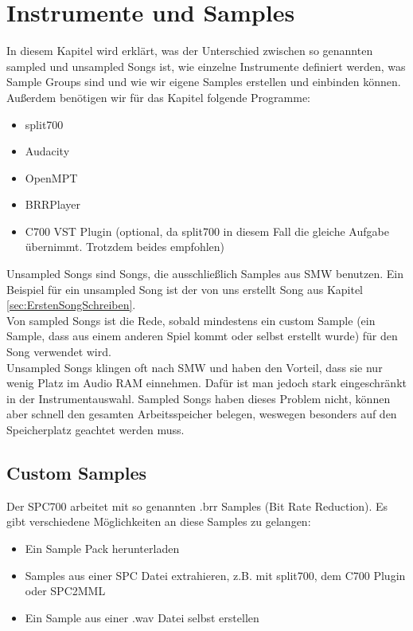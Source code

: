 \section{Instrumente und Samples}

In diesem Kapitel wird erklärt, was der Unterschied zwischen so genannten sampled und unsampled Songs ist, wie einzelne Instrumente definiert werden, was Sample Groups sind und wie wir eigene Samples erstellen und einbinden können. \\
Außerdem benötigen wir für das Kapitel folgende Programme:

\medskip

\begin{itemize}
	\item split700
	\item Audacity
	\item OpenMPT
	\item BRRPlayer
	\item C700 VST Plugin (optional, da split700 in diesem Fall die gleiche Aufgabe übernimmt. Trotzdem beides empfohlen)
\end{itemize}

\medskip


Unsampled Songs sind Songs, die ausschließlich Samples aus SMW benutzen. Ein Beispiel für ein unsampled Song ist der von uns erstellt Song aus Kapitel \ref{sec:ErstenSongSchreiben}. \\
Von sampled Songs ist die Rede, sobald mindestens ein custom Sample (ein Sample, dass aus einem anderen Spiel kommt oder selbst erstellt wurde) für den Song verwendet wird. \\
Unsampled Songs klingen oft nach SMW und haben den Vorteil, dass sie nur wenig Platz im Audio RAM einnehmen. Dafür ist man jedoch stark eingeschränkt in der Instrumentauswahl. Sampled Songs haben dieses Problem nicht, können aber schnell den gesamten Arbeitsspeicher belegen, weswegen besonders auf den Speicherplatz geachtet werden muss.

\subsection{Custom Samples}

Der SPC700 arbeitet mit so genannten .brr Samples (Bit Rate Reduction). Es gibt verschiedene Möglichkeiten an diese Samples zu gelangen:

\medskip

\begin{itemize}
	\item Ein Sample Pack herunterladen
	\item Samples aus einer SPC Datei extrahieren, z.B. mit split700, dem C700 Plugin oder SPC2MML
	\item Ein Sample aus einer .wav Datei selbst erstellen 
\end{itemize}


